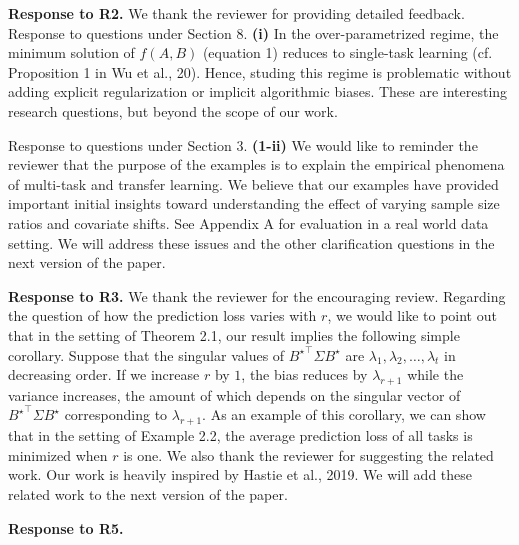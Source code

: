\documentclass{article}
\begin{document}
	\textbf{Response to R2.} We thank the reviewer for providing detailed feedback.
	Response to questions under Section 8.
	\textbf{(i)}
	In the over-parametrized regime, the minimum solution of $f(A ,B)$ (equation 1) reduces to single-task learning  (cf. Proposition 1 in Wu et al., 20).
	Hence, studing this regime is problematic without adding explicit regularization or implicit algorithmic biases.
	These are interesting research questions, but beyond the scope of our work.

	Response to questions under Section 3.
	\textbf{(1-ii)} We would like to reminder the reviewer that the purpose of the examples is to explain the empirical phenomena of multi-task and transfer learning.
	We believe that our examples have provided important initial insights toward understanding the effect of varying sample size ratios and covariate shifts.
	See Appendix A for evaluation in a real world data setting.
	We will address these issues and the other clarification questions in the next version of the paper.

	\textbf{Response to R3.}
	We thank the reviewer for the encouraging review.
	Regarding the question of how the prediction loss varies with $r$, we would like to point out that in the setting of Theorem 2.1, our result implies the following simple corollary.
	Suppose that the singular values of ${B^{\star}}^{\top}\Sigma B^{\star}$ are $\lambda_1, \lambda_2, \dots, \lambda_t$ in decreasing order.
	If we increase $r$ by $1$, the bias reduces by $\lambda_{r+1}$ while the variance increases, the amount of which depends on the singular vector of  ${B^{\star}}^{\top}\Sigma B^{\star}$ corresponding to $\lambda_{r+1}$.
	As an example of this corollary, we can show that in the setting of Example 2.2, the average prediction loss of all tasks is minimized when $r$ is one.
	We also thank the reviewer for suggesting the related work.
	Our work is heavily inspired by Hastie et al., 2019.
	We will add these related work to the next version of the paper.

	\textbf{Response to R5.}
\end{document}
